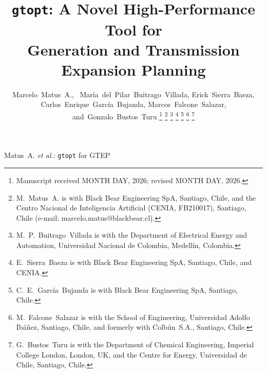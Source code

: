 \documentclass[journal]{IEEEtran}
\newcommand{\gtopt}{\texttt{gtopt}}
\begin{document}
\title{%
  \gtopt{}: A Novel High-Performance Tool for\\
  Generation and Transmission Expansion Planning%
}

\author{%
  Marcelo~Matus~A.,~
  Mar\'ia~del~Pilar~Buitrago~Villada,
  Erick~Sierra~Baeza,
  Carlos~Enrique~Garc\'ia~Bujanda,
  Marcos~Falcone~Salazar,
  and~Gonzalo~Bustos~Turu%
  \thanks{Manuscript received MONTH DAY, 2026; revised MONTH DAY, 2026.}%
  \thanks{M.~Matus~A. is with Black Bear Engineering SpA, Santiago,
    Chile, and the Centro Nacional de Inteligencia Artificial
    (CENIA, FB210017), Santiago, Chile
    (e-mail: marcelo.matus@blackbear.cl).}%
  \thanks{M.~P.~Buitrago~Villada is with the Department of Electrical
    Energy and Automation, Universidad Nacional de Colombia,
    Medell\'in, Colombia.}%
  \thanks{E.~Sierra~Baeza is with Black Bear Engineering SpA, Santiago,
    Chile, and CENIA.}%
  \thanks{C.~E.~Garc\'ia~Bujanda is with Black Bear Engineering SpA,
    Santiago, Chile.}%
  \thanks{M.~Falcone~Salazar is with the School of Engineering,
    Universidad Adolfo Ib\'a\~nez, Santiago, Chile, and formerly with
    Colb\'un~S.A., Santiago, Chile.}%
  \thanks{G.~Bustos~Turu is with the Department of Chemical Engineering,
    Imperial College London, London, UK, and the Centre for Energy,
    Universidad de Chile, Santiago, Chile.}%
}

%
  {Matus~A. \MakeLowercase{\textit{et al.}}: \gtopt{} for GTEP}

\maketitle
\end{document}
